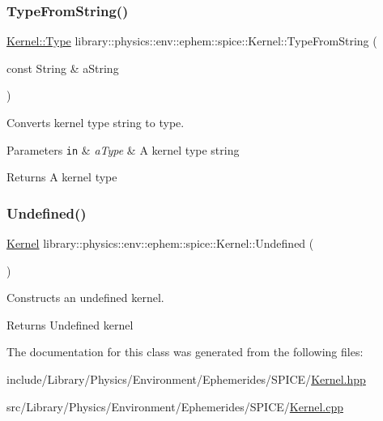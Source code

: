 \subsubsection{\texorpdfstring{Type\+From\+String()}{TypeFromString()}}
{\footnotesize\ttfamily \hyperlink{classlibrary_1_1physics_1_1env_1_1ephem_1_1spice_1_1_kernel_ab28fd08b98057f635ee6a0e75b59fae6}{Kernel\+::\+Type} library\+::physics\+::env\+::ephem\+::spice\+::\+Kernel\+::\+Type\+From\+String (\begin{DoxyParamCaption}\item[{const String \&}]{a\+String }\end{DoxyParamCaption})\hspace{0.3cm}{\ttfamily [static]}}



Converts kernel type string to type. 


\begin{DoxyParams}[1]{Parameters}
\mbox{\tt in}  & {\em a\+Type} & A kernel type string \\
\hline
\end{DoxyParams}
\begin{DoxyReturn}{Returns}
A kernel type 
\end{DoxyReturn}
\mbox{\label{classlibrary_1_1physics_1_1env_1_1ephem_1_1spice_1_1_kernel_a36f572782b1ee7faa26b905694575a1c}} 
\subsubsection{\texorpdfstring{Undefined()}{Undefined()}}
{\footnotesize\ttfamily \hyperlink{classlibrary_1_1physics_1_1env_1_1ephem_1_1spice_1_1_kernel}{Kernel} library\+::physics\+::env\+::ephem\+::spice\+::\+Kernel\+::\+Undefined (\begin{DoxyParamCaption}{ }\end{DoxyParamCaption})\hspace{0.3cm}{\ttfamily [static]}}



Constructs an undefined kernel. 

\begin{DoxyReturn}{Returns}
Undefined kernel 
\end{DoxyReturn}


The documentation for this class was generated from the following files\+:\begin{DoxyCompactItemize}
\item 
include/\+Library/\+Physics/\+Environment/\+Ephemerides/\+S\+P\+I\+C\+E/\hyperlink{_kernel_8hpp}{Kernel.\+hpp}\item 
src/\+Library/\+Physics/\+Environment/\+Ephemerides/\+S\+P\+I\+C\+E/\hyperlink{_kernel_8cpp}{Kernel.\+cpp}\end{DoxyCompactItemize}
